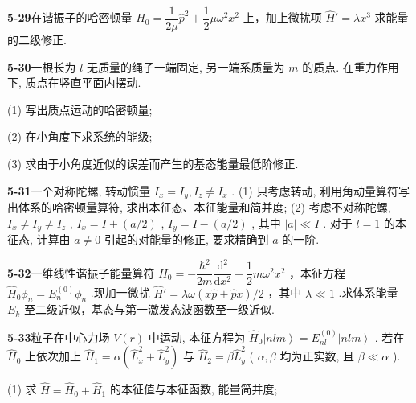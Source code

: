 \vfill

\newpage

\textbf{5-29}\quad 在谐振子的哈密顿量 $\displaystyle \hat{H}_0 = \dfrac{1}{2\mu}\hat{p}^2 +\dfrac{1}{2}\mu \omega^2 x^2$ 上，加上微扰项 $\displaystyle \hat{H}' = \lambda x^3$ 求能量的二级修正.

\vfill

\newpage

\textbf{5-30}\quad 一根长为 $\displaystyle l$ 无质量的绳子一端固定, 另一端系质量为 $\displaystyle m$ 的质点. 在重力作用下, 质点在竖直平面内摆动.

(1) 写出质点运动的哈密顿量;

(2) 在小角度下求系统的能级;

(3) 求由于小角度近似的误差而产生的基态能量最低阶修正.

\vfill

\newpage

\textbf{5-31}\quad 一个对称陀螺, 转动惯量 $\displaystyle I_x = I_y, I_z \neq I_x$ . (1) 只考虑转动, 利用角动量算符写出体系的哈密顿量算符, 求出本征态、本征能量和简并度; (2) 考虑不对称陀螺, $\displaystyle I_x \neq I_y \neq I_z$ , $\displaystyle I_x = I + (a/2)$ , $\displaystyle I_y = I - (a/2)$ , 其中 $\displaystyle |a| \ll I$ . 对于 $\displaystyle l = 1$ 的本征态, 计算由 $\displaystyle a \neq 0$ 引起的对能量的修正, 要求精确到 $\displaystyle a$ 的一阶.

\vfill

\newpage

\textbf{5-32}\quad 一维线性谐振子能量算符 $\displaystyle \hat{H}_0 = -\dfrac{\hbar^2}{2m}\dfrac{\mathrm{d}^2}{\mathrm{d}x^2} +\dfrac{1}{2} m\omega^2 x^2$ ，本征方程 $\displaystyle \hat{H}_0\phi_n = E_n^{(0)}\phi_n$ .现加一微扰 $\displaystyle \hat{H}' = \lambda \omega (x\hat{p} +\hat{p} x) / 2$ ，其中 $\displaystyle \lambda \ll 1$ .求体系能量 $\displaystyle E_{k}$ 至二级近似，基态与第一激发态波函数至一级近似.

\vfill

\newpage

\textbf{5-33}\quad 粒子在中心力场 $\displaystyle V(r)$ 中运动, 本征方程为 $\displaystyle \hat{H}_0\left|nlm\right\rangle = E_{nl}^{(0)}\left|nlm\right\rangle$ . 若在 $\displaystyle \hat{H}_0$ 上依次加上 $\displaystyle \hat{H}_1 = \alpha (\hat{L}_x^2 + \hat{L}_y^2)$ 与 $\displaystyle \hat{H}_2 = \beta \hat{L}_y^2$ ( $\displaystyle \alpha, \beta$ 均为正实数, 且 $\displaystyle \beta \ll \alpha$ ).

(1) 求 $\displaystyle \hat{H} = \hat{H}_0 + \hat{H}_1$ 的本征值与本征函数, 能量简并度;

